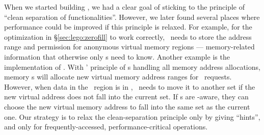 When we started building \lego, we had a clear goal of sticking to
the principle of ``clean separation of functionalities''.
However, we later found several places where performance could be improved 
if this principle is relaxed.
For example, for the optimization in \S\ref{sec:lego:zerofill} to work correctly,
\pcomponent\ needs to store the address range and permission for anonymous virtual memory regions --- 
memory-related information that otherwise only \mcomponent{}s need to know.
Another example is the implementation of \mremap.
With \lego' principle of \mcomponent{}s handling all memory address allocations,
memory \microos{}s will allocate new virtual memory address ranges for \mremap\ requests.
However, when data in the \mremap\ region is in \excache, 
\lego\ needs to move it to another set if the new virtual address does not fall into the 
current set.
If \mcomponent{}s are \excache-aware, they can choose the new virtual memory address
to fall into the same set as the current one.
Our strategy is to relax the clean-separation principle only by giving ``hints'', 
and only for frequently-accessed,
performance-critical operations.
